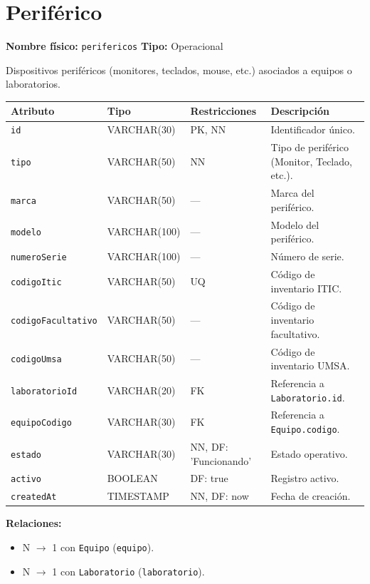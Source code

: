 \documentclass[12pt,a4paper]{article}
\newenvironment{tabladesc}[3]{%
  \section{#1}
  \textbf{Nombre físico:} \texttt{#2} \hfill \textbf{Tipo:} #3\par
  \medskip
}{%
  \bigskip
}
\begin{document}
\begin{tabladesc}{Periférico}{perifericos}{Operacional}

Dispositivos periféricos (monitores, teclados, mouse, etc.) asociados a equipos o laboratorios.

\bigskip
\begin{longtable}{L{3.5cm} L{2.5cm} L{2cm} L{7.5cm}}
\toprule
\textbf{Atributo} & \textbf{Tipo} & \textbf{Restricciones} & \textbf{Descripción} \\
\midrule
\endhead
\bottomrule
\endfoot
\texttt{id}              & VARCHAR(30)  & PK, NN & Identificador único. \\
\texttt{tipo}            & VARCHAR(50)  & NN     & Tipo de periférico (Monitor, Teclado, etc.). \\
\texttt{marca}           & VARCHAR(50)  & ---    & Marca del periférico. \\
\texttt{modelo}          & VARCHAR(100) & ---    & Modelo del periférico. \\
\texttt{numeroSerie}     & VARCHAR(100) & ---    & Número de serie. \\
\texttt{codigoItic}      & VARCHAR(50)  & UQ     & Código de inventario ITIC. \\
\texttt{codigoFacultativo}& VARCHAR(50) & ---    & Código de inventario facultativo. \\
\texttt{codigoUmsa}      & VARCHAR(50)  & ---    & Código de inventario UMSA. \\
\texttt{laboratorioId}   & VARCHAR(20)  & FK     & Referencia a \texttt{Laboratorio.id}. \\
\texttt{equipoCodigo}    & VARCHAR(30)  & FK     & Referencia a \texttt{Equipo.codigo}. \\
\texttt{estado}          & VARCHAR(30)  & NN, DF: 'Funcionando' & Estado operativo. \\
\texttt{activo}          & BOOLEAN      & DF: true & Registro activo. \\
\texttt{createdAt}       & TIMESTAMP    & NN, DF: now & Fecha de creación. \\
\bottomrule
\end{longtable}

\textbf{Relaciones:}
\begin{itemize}[nosep]
  \item N $\rightarrow$ 1 con \texttt{Equipo} (\texttt{equipo}).
  \item N $\rightarrow$ 1 con \texttt{Laboratorio} (\texttt{laboratorio}).
\end{itemize}
\end{tabladesc}
\end{document}
